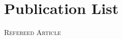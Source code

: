 \documentclass[11pt,a4paper,sans]{moderncv}
\begin{document}

\section{Publication List}
\noindent
{\Large \textsc{Refereed Article} }
\\
\end{document}
